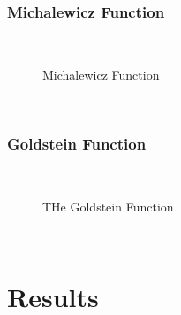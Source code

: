 \subsubsection{Michalewicz Function}
~
\begin{figure}[ht]
	\centering
	\setlength \fboxsep{0pt}
	\setlength \fboxrule{0.5pt}
	\caption{Michalewicz Function}
	\label{fig:MichalewiczGraph}
\end{figure}
~
\subsubsection{Goldstein Function}
~
~
\begin{figure}[ht]
	\centering
	\setlength \fboxsep{0pt}
	\setlength \fboxrule{0.5pt}
	\caption{THe Goldstein Function}
	\label{fig:GoldsteinGraph}
\end{figure}
~

\section{Results}

